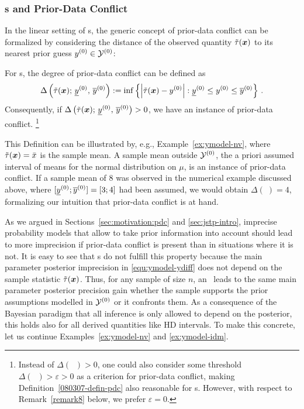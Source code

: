 \subsubsection{\ymodel s and Prior-Data Conflict}
\label{section:fixednschlecht}

In the linear setting of \ymodel s, the generic concept of prior-data conflict
can be formalized by considering the distance of the observed quantity $\tilde{\tau}({\bm x})$ to
its nearest prior guess $y^{(0)} \in \mathcal{Y}^{(0)}$:
%
\begin{definition}\label{080307-defin-pdc}
For \ymodel s, the degree of prior-data conflict can be defined %
as
\begin{equation}\label{se-071217}
\Delta \left(\tilde{\tau}({\bm x});\, \underline{y}^{(0)},\,\overline{y}^{(0)}\right)
:= \inf \left\{ \left| \tilde{\tau}({\bm x}) - y^{(0)} \right|: \underline{y}^{(0)} \le y^{(0)} \le \overline{y}^{(0)} \right\}\,.
\end{equation}
Consequently, if
$\Delta \left(\tilde{\tau}({\bm x});\, \underline{y}^{(0)},\,\overline{y}^{(0)}\right) > 0$,
we have an instance of prior-data conflict.%
\footnote{Instead of $\Delta(\;\;) > 0$, one could also consider some
threshold $\Delta(\;\;) > \varepsilon > 0$ as a criterion for prior-data conflict, making
Definition~\ref{080307-defin-pdc} also reasonable for \model s.
However, with respect to Remark~\ref{remark8} below, we prefer $\varepsilon = 0$.}
\end{definition}
This Definition can be illustrated by, e.g., Example~\ref{ex:ymodel-nv}, where $\tilde{\tau}({\bm x}) = \bar{x}$
is the sample mean. A sample mean outside $\mathcal{Y}^{(0)}$, the a priori assumed interval
of means for the normal distribution on $\mu$, is an instance of prior-data conflict.
If a sample mean of $8$ was observed in the numerical example discussed above, where
$[\underline{y}^{(0)} ; \overline{y}^{(0)}] =[3;4]$ had been assumed, we would obtain $\Delta(\;) = 4$,
formalizing our intuition that prior-data conflict is at hand.

As we argued in Sections~\ref{sec:motivation:pdc} and \ref{sec:jstp-intro},
imprecise probability models that allow to take prior information into account
should lead to more imprecision if prior-data
conflict is present than in situations where it is not.
%
It is easy to see that \ymodel s do not fulfill this property
because the main parameter posterior imprecision in
\eqref{equ:ymodel-ydiff} does not depend on the sample statistic
$\tilde{\tau}({\bm x})$. Thus, for any sample of size $n$, an \ymodel\ leads
to the same main parameter posterior precision gain
whether the sample supports the prior assumptions modelled in
$\mathcal{Y}^{(0)}$ or it confronts them. As a consequence of the
Bayesian paradigm that all inference is only allowed to depend on
the posterior, this holds also for all derived quantities
like HD intervals. To make this concrete,
let us continue Examples~\ref{ex:ymodel-nv} and \ref{ex:ymodel-idm}.

